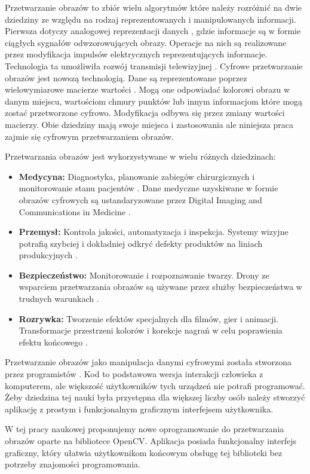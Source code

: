 
Przetwarzanie obrazów to zbiór wielu algorytmów które należy rozróżnić na dwie dziedziny ze względu na rodzaj reprezentowanych i manipulowanych informacji.
Pierwsza dotyczy analogowej reprezentacji danych \cite{signalProcessing}, gdzie informacje są w formie ciągłych sygnałów odwzorowujących obrazy. 
Operacje na nich są realizowane przez modyfikacja impulsów elektrycznych reprezentujących informacje. 
Technologia ta umożliwiła rozwój transmisji telewizyjnej \cite{times1926}.
Cyfrowe przetwarzanie obrazów \cite{digitalImageProcessing} jest nowszą technologią.
Dane są reprezentowane poprzez wielowymiarowe macierze wartości \cite{OpenCVMat}. 
Mogą one odpowiadać kolorowi obrazu w danym miejscu, wartościom chmury punktów lub innym informacjom które mogą zostać przetworzone cyfrowo. 
Modyfikacja odbywa się przez zmiany wartości macierzy. 
Obie dziedziny mają swoje miejsca i zastosowania ale niniejsza praca zajmie się cyfrowym przetwarzaniem obrazów.

Przetwarzania obrazów jest wykorzystywane w wielu różnych dziedzinach: 
\begin{itemize}
    \item \textbf{Medycyna:} Diagnostyka, planowanie zabiegów chirurgicznych i monitorowanie stanu pacjentów \cite{skszymon2023}. 
    Dane medyczne uzyskiwane w formie obrazów cyfrowych są ustandaryzowane przez Digital Imaging and Communications in Medicine \cite{DICOMPart01}.
    \item \textbf{Przemysł:} Kontrola jakości, automatyzacja i inspekcja. Systemy wizyjne potrafią szybciej i dokładniej odkryć defekty produktów na liniach produkcyjnych \cite{Nix2024}.
    \item \textbf{Bezpieczeństwo:} Monitorowanie i rozpoznawanie twarzy. Drony ze wsparciem przetwarzania obrazów są używane przez służby bezpieczeństwa w trudnych warunkach \cite{dji}.
    \item \textbf{Rozrywka:} Tworzenie efektów specjalnych dla filmów, gier i animacji. Transformacje przestrzeni kolorów i korekcje nagrań w celu poprawienia efektu końcowego \cite{cinema}.
\end{itemize}

Przetwarzanie obrazów jako manipulacja danymi cyfrowymi została stworzona przez programistów \cite{computerProcessing}. 
Kod to podstawowa wersja interakcji człowieka z komputerem, ale większość użytkowników tych urządzeń nie potrafi programować. 
Żeby dziedzina tej nauki była przystępna dla większej liczby osób należy stworzyć aplikację z prostym i funkcjonalnym graficznym interfejsem użytkownika. 

W tej pracy naukowej proponujemy nowe oprogramowanie do przetwarzania obrazów oparte na bibliotece OpenCV. 
Aplikacja posiada funkcjonalny interfejs graficzny, który ułatwia użytkownikom końcowym obsługę tej biblioteki bez potrzeby znajomości programowania.